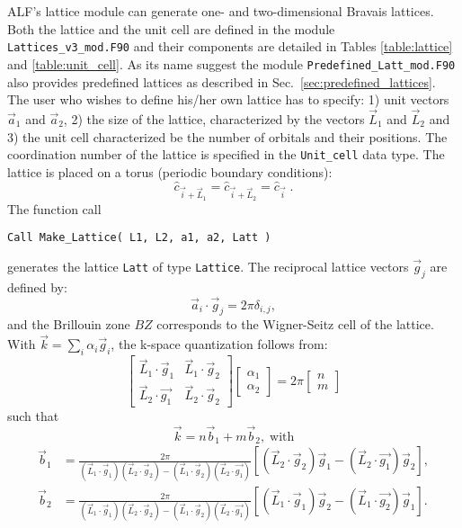 ALF's lattice module can generate one- and two-dimensional Bravais lattices.
Both the lattice and the unit cell are defined in the module \texttt{Lattices\_v3\_mod.F90} and their components are detailed in Tables \ref{table:lattice} and \ref{table:unit_cell}. 
As  its name suggest the module  \texttt{Predefined\_Latt\_mod.F90} also provides predefined lattices as  described in Sec.~\ref{sec:predefined_lattices}.
The user who wishes to define his/her own lattice has to specify: 1) unit vectors $\vec{a}_1$ and $\vec{a}_2$, 2) the size of the lattice, characterized by the vectors $\vec{L}_1$ and $\vec{L}_2$ and 3) the  unit cell characterized be the number of orbitals and their positions.  The coordination number of the lattice is specified in the \texttt{Unit\_cell} data type.   The lattice is placed on a torus (periodic boundary conditions):
\begin{equation}
	\hat{c}_{\vec{i} + \vec{L}_1 }  =  \hat{c}_{\vec{i} + \vec{L}_2 }  = \hat{c}_{\vec{i}}\;.
\end{equation}
The function call 
\begin{lstlisting}[style=fortran]
Call Make_Lattice( L1, L2, a1, a2, Latt )
\end{lstlisting}
generates the lattice \texttt{Latt} of type \texttt{Lattice}.   The reciprocal lattice vectors $\vec{g}_j$ are defined by:
\begin{equation}
\label{Latt.G.eq}
	\vec{a}_i  \cdot \vec{g}_j = 2 \pi \delta_{i,j}, 
\end{equation}
and the Brillouin zone $BZ$ corresponds to the Wigner-Seitz cell of the lattice. 
With $\vec{k} = \sum_{i} \alpha_i  \vec{g}_i $, the  k-space quantization follows from: 
\begin{equation}
\begin{bmatrix}
	\vec{L}_1 \cdot \vec{g}_1  &  \vec{L}_1 \cdot \vec{g}_2  \\
	\vec{L}_2  \cdot \vec{g_1} & \vec{L}_2 \cdot  \vec{g}_2  
\end{bmatrix}
\begin{bmatrix}
   \alpha_1 \\
   \alpha_2
\end{bmatrix}
=  2 \pi 
\begin{bmatrix}
   n \\
   m
\end{bmatrix}
\end{equation}
such that 
\begin{equation}
\vec{k} =  n \vec{b}_1  + m \vec{b}_2,\; \text{with}
\end{equation}
\begin{align} \label{k.quant.eq}
\vec{b}_1 &= \frac{2 \pi}{ (\vec{L}_1 \cdot \vec{g}_1)  (\vec{L}_2 \cdot  \vec{g}_2 )  - (\vec{L}_1 \cdot \vec{g}_2) (\vec{L}_2  \cdot \vec{g_1} ) }   \left[  (\vec{L}_2 \cdot  \vec{g}_2) \vec{g}_1 -   (\vec{L}_2  \cdot \vec{g_1} ) \vec{g}_2 \right], \nonumber \\ 
\vec{b}_2 &= \frac{2 \pi}{ (\vec{L}_1 \cdot \vec{g}_1)  (\vec{L}_2 \cdot  \vec{g}_2 )  - (\vec{L}_1 \cdot \vec{g}_2) (\vec{L}_2  \cdot \vec{g_1} ) }   
\left[  (\vec{L}_1 \cdot  \vec{g}_1) \vec{g}_2 -   (\vec{L}_1  \cdot \vec{g_2} ) \vec{g}_1 \right].
\end{align}

